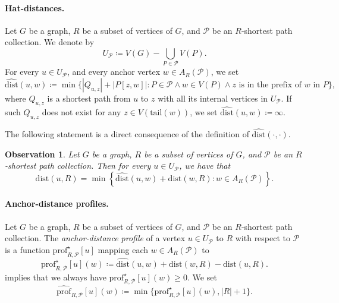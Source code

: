 \documentclass[11pt,a4paper]{article}
\newtheorem{observation}{Observation}[section]
\newcommand{\hatprofile}[3]{\widehat{\mathrm{prof}}_{#1,#2}[#3]}
\newcommand{\diststarprofile}[3]{\mathrm{prof}^\star_{#1,#2}[#3]}
\newcommand{\dist}{\mathrm{dist}}
\renewcommand{\geq}{\geqslant}
\begin{document}
\paragraph{Hat-distances.}
Let $G$ be a graph, $R$ be a subset of vertices of $G$, and $\mathcal{P}$ be an $R$-shortest path collection.
We denote by $$U_{\mathcal{P}}\coloneqq V(G)-\bigcup_{P\in\mathcal{P}}V(P).$$
For every $u\in U_{\mathcal{P}}$,
and every anchor vertex $w\in A_R(\mathcal{P})$,
we set 
\[ \widehat{\dist}(u,w)\coloneqq \min\{|Q_{u,z}|+|P[z,w]|\colon
P \in \mathcal{P} \wedge w \in V(P) \wedge 
z\text{ is in the prefix of $w$ in $P$}\},\] 
where $Q_{u,z}$ is a shortest path from $u$ to $z$ with all its internal vertices in $U_{\mathcal{P}}$.
If such $Q_{u,z}$ does not exist for any $z \in V(\mathrm{tail}(w))$,
we set $\widehat{\dist}(u, w) \coloneqq \infty$. 

The following statement is a direct consequence of the definition of $\widehat{\dist}(\cdot,\cdot)$.

\begin{observation}
  \label{obs:dist}
  Let $G$ be a graph, $R$ be a subset of vertices of $G$, and $\mathcal{P}$ be
  an $R$-shortest path collection.
  Then for every $u\in U_{\mathcal{P}}$, we have that $$\dist(u,R)=\min \left\{\widehat{\dist}(u,w)+ \dist(w,R)
  \colon w\in A_R(\mathcal{P})\right\}.$$
\end{observation}

\paragraph{Anchor-distance profiles.}
Let $G$ be a graph, $R$ be a subset of vertices of $G$,  and $\mathcal{P}$
be an $R$-shortest path collection.
The \emph{anchor-distance profile} of a vertex $u\in U_{\mathcal{P}}$ to $R$ with respect to $\mathcal{P}$
is a function $\diststarprofile{R}{\mathcal{P}}{u}$ mapping each $w \in A_R(\mathcal{P})$ to
\[\diststarprofile{R}{\mathcal{P}}{u}(w) \coloneqq \widehat{\dist}(u,w) + \dist(w,R)
 - \dist(u,R).\]
 implies that we always have $\diststarprofile{R}{\mathcal{P}}{u}(w) \geq 0$.
We set
\[\hatprofile{R}{\mathcal{P}}{u}(w)\coloneqq\min\{\diststarprofile{R}{\mathcal{P}}{u}(w),|R|+1\}.\]
\end{document}
